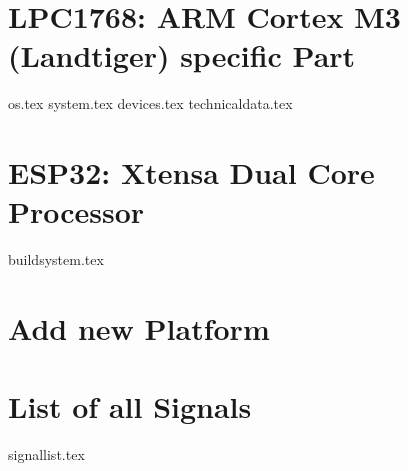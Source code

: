 \documentclass[12pt]{scrbook}
\begin{document}
\chapter{LPC1768: ARM Cortex M3 (Landtiger) specific Part}
{os.tex}
{system.tex}
{devices.tex}
{technicaldata.tex}

\chapter{ESP32: Xtensa Dual Core Processor}
{buildsystem.tex}

\chapter{Add new Platform}


\chapter{List of all Signals}
{signallist.tex}


\end{document}
